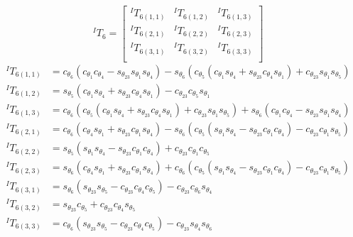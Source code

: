 \documentclass[12pt]{report}
\begin{document}
\[
^IT_6 =
\begin{bmatrix}
  ^IT_{6(1,1)} & ^IT_{6(1,2)} & ^IT_{6(1,3)}\\
  ^IT_{6(2,1)} & ^IT_{6(2,2)} & ^IT_{6(2,3)}\\
  ^IT_{6(3,1)} & ^IT_{6(3,2)} & ^IT_{6(3,3)}\\
\end{bmatrix}
\]
\[
\begin{aligned}
^IT_{6(1,1)} &=
c_{\theta_6}(c_{\theta_1}c_{\theta_4} - s_{\theta_{23}}s_{\theta_1}s_{\theta_4}) - s_{\theta_6}(c_{\theta_5}(c_{\theta_1}s_{\theta_4} + s_{\theta_{23}}c_{\theta_4}s_{\theta_1}) + c_{\theta_{23}}s_{\theta_1}s_{\theta_5})\\
^IT_{6(1,2)} &=
s_{\theta_5}(c_{\theta_1}s_{\theta_4} + s_{\theta_{23}}c_{\theta_4}s_{\theta_1}) - c_{\theta_{23}}c_{\theta_5}s_{\theta_1}\\
^IT_{6(1,3)} &=
c_{\theta_6}(c_{\theta_5}(c_{\theta_1}s_{\theta_4} + s_{\theta_{23}}c_{\theta_4}s_{\theta_1}) + c_{\theta_{23}}s_{\theta_1}s_{\theta_5}) + s_{\theta_6}(c_{\theta_1}c_{\theta_4} - s_{\theta_{23}}s_{\theta_1}s_{\theta_4})\\
^IT_{6(2,1)} &=
c_{\theta_6}(c_{\theta_4}s_{\theta_1} + s_{\theta_{23}}c_{\theta_1}s_{\theta_4}) - s_{\theta_6}(c_{\theta_5}(s_{\theta_1}s_{\theta_4} - s_{\theta_{23}}c_{\theta_1}c_{\theta_4}) - c_{\theta_{23}}c_{\theta_1}s_{\theta_5})\\
^IT_{6(2,2)} &=
s_{\theta_5}(s_{\theta_1}s_{\theta_4} - s_{\theta_{23}}c_{\theta_1}c_{\theta_4}) + c_{\theta_{23}}c_{\theta_1}c_{\theta_5}\\
^IT_{6(2,3)} &=
s_{\theta_6}(c_{\theta_4}s_{\theta_1} + s_{\theta_{23}}c_{\theta_1}s_{\theta_4}) + c_{\theta_6}(c_{\theta_5}(s_{\theta_1}s_{\theta_4} - s_{\theta_{23}}c_{\theta_1}c_{\theta_4}) - c_{\theta_{23}}c_{\theta_1}s_{\theta_5})\\
^IT_{6(3,1)} &=
s_{\theta_6}(s_{\theta_{23}}s_{\theta_5} - c_{\theta_{23}}c_{\theta_4}c_{\theta_5}) - c_{\theta_{23}}c_{\theta_6}s_{\theta_4}\\
^IT_{6(3,2)} &=
s_{\theta_{23}}c_{\theta_5} + c_{\theta_{23}}c_{\theta_4}s_{\theta_5}\\
^IT_{6(3,3)} &=
c_{\theta_6}(s_{\theta_{23}}s_{\theta_5} - c_{\theta_{23}}c_{\theta_4}c_{\theta_5}) - c_{\theta_{23}}s_{\theta_4}s_{\theta_6}
\end{aligned}
\]

\newpage
\end{document}
